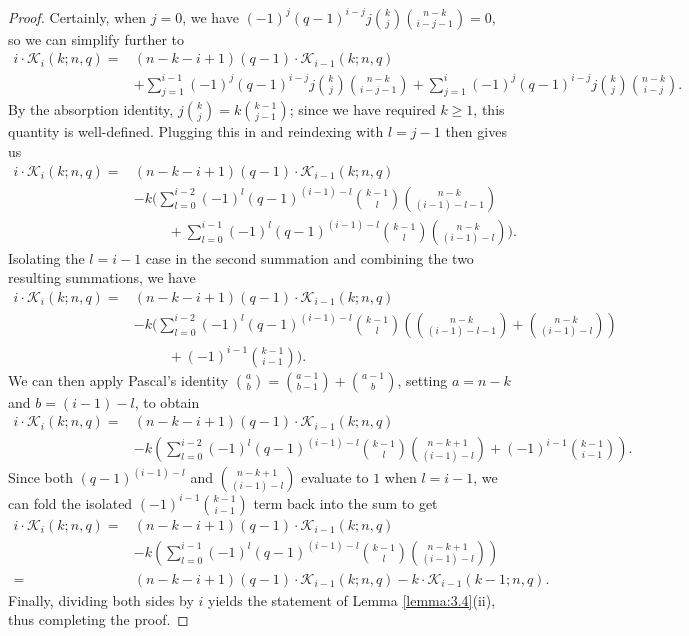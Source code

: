 \documentclass[10pt,a4paper]{amsart}
\def\K{\mathcal{K}}
\begin{document}
\begin{proof}
    Certainly, when $j = 0$, we have $(-1)^j (q - 1)^{i - j} j \binom{k}{j} \binom{n - k}{i - j - 1} = 0$, so we can simplify further to
    \begin{align*}
        i \cdot \K_i(k; n, q) ={} & (n - k - i + 1)(q - 1) \cdot \K_{i - 1}(k; n, q) \\
        & + \sum_{j = 1}^{i - 1} (-1)^j (q - 1)^{i - j} j \binom{k}{j} \binom{n - k}{i - j - 1} + \sum_{j = 1}^i (-1)^j (q - 1)^{i - j} j \binom{k}{j} \binom{n - k}{i - j}.
    \end{align*}
    By the absorption identity, $j\binom{k}{j} = k\binom{k - 1}{j - 1}$; since we have required $k \ge 1$, this quantity is well-defined. Plugging this in and reindexing with $l = j - 1$ then gives us
    \begin{align*}
        i \cdot \K_i(k; n, q) ={} & (n - k - i + 1)(q - 1) \cdot \K_{i - 1}(k; n, q) \\
        & - k\Biggl(\sum_{l = 0}^{i - 2} (-1)^l (q - 1)^{(i - 1) - l} \binom{k - 1}{l} \binom{n - k}{(i - 1) - l - 1} \\
        & \phantom{\; - k\Biggl(} + \sum_{l = 0}^{i - 1} (-1)^l (q - 1)^{(i - 1) - l} \binom{k - 1}{l} \binom{n - k}{(i - 1) - l}\Biggr).
    \end{align*}
    Isolating the $l = i - 1$ case in the second summation and combining the two resulting summations, we have
    \begin{align*}
        i \cdot \K_i(k; n, q) ={} & (n - k - i + 1)(q - 1) \cdot \K_{i - 1}(k; n, q) \\
        & - k\Biggl(\sum_{l = 0}^{i - 2} (-1)^l (q - 1)^{(i - 1) - l} \binom{k - 1}{l} {\left(\binom{n - k}{(i - 1) - l - 1} + \binom{n - k}{(i - 1) - l}\right)} \\
        & \phantom{\; - k\Biggl(} + (-1)^{i - 1} \binom{k - 1}{i - 1}\Biggr).
    \end{align*}
    We can then apply Pascal's identity $\binom{a}{b} = \binom{a - 1}{b - 1} + \binom{a - 1}{b}$, setting $a = n - k$ and $b = (i - 1) - l$, to obtain
    \begin{align*}
        i \cdot \K_i(k; n, q) ={} & (n - k - i + 1)(q - 1) \cdot \K_{i - 1}(k; n, q) \\
        & - k{\left(\sum_{l = 0}^{i - 2} (-1)^l (q - 1)^{(i - 1) - l} \binom{k - 1}{l} \binom{n - k + 1}{(i - 1) - l} + (-1)^{i - 1} \binom{k - 1}{i - 1}\right)}.
    \end{align*}
    Since both $(q - 1)^{(i - 1) - l}$ and $\binom{n - k + 1}{(i - 1) - l}$ evaluate to $1$ when $l = i - 1$, we can fold the isolated $(-1)^{i - 1} \binom{k - 1}{i - 1}$ term back into the sum to get
    \begin{align*}
        i \cdot \K_i(k; n, q) ={} & (n - k - i + 1)(q - 1) \cdot \K_{i - 1}(k; n, q) \\
        & - k{\left(\sum_{l = 0}^{i - 1} (-1)^l (q - 1)^{(i - 1) - l} \binom{k - 1}{l} \binom{n - k + 1}{(i - 1) - l}\right)} \\
        ={} & (n - k - i + 1)(q - 1) \cdot \K_{i - 1}(k; n, q) - k \cdot \K_{i - 1}({k - 1}; n, q).
    \end{align*}
    Finally, dividing both sides by $i$ yields the statement of Lemma \ref{lemma:3.4}(ii), thus completing the proof.
\end{proof}
\end{document}

